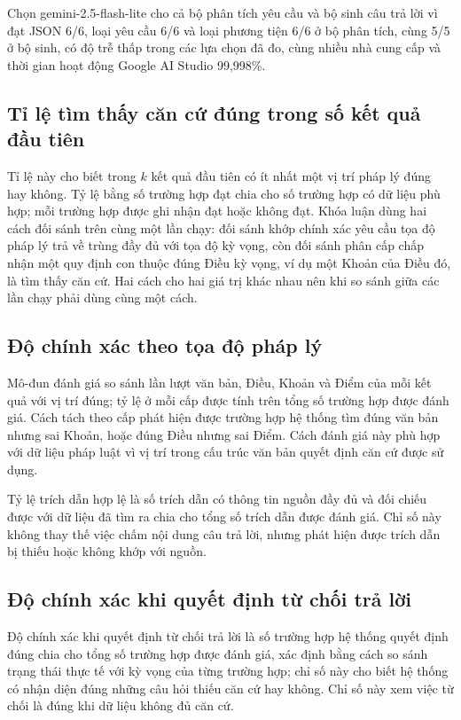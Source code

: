 \documentclass[12pt,a4paper,oneside]{report}
\begin{document}
Chọn gemini-2.5-flash-lite cho cả bộ phân tích yêu cầu và bộ sinh câu trả lời vì đạt JSON 6/6, loại yêu cầu 6/6 và loại phương tiện 6/6 ở bộ phân tích, cùng 5/5 ở bộ sinh, có độ trễ thấp trong các lựa chọn đã đo, cùng nhiều nhà cung cấp và thời gian hoạt động Google AI Studio 99,998\%.
\subsection{Tỉ lệ tìm thấy căn cứ đúng trong số kết quả đầu tiên}
Tỉ lệ này cho biết trong $k$ kết quả đầu tiên có ít nhất một vị trí pháp lý đúng hay không. Tỷ lệ bằng số trường hợp đạt chia cho số trường hợp có dữ liệu phù hợp; mỗi trường hợp được ghi nhận đạt hoặc không đạt. Khóa luận dùng hai cách đối sánh trên cùng một lần chạy: đối sánh khớp chính xác yêu cầu tọa độ pháp lý trả về trùng đầy đủ với tọa độ kỳ vọng, còn đối sánh phân cấp chấp nhận một quy định con thuộc đúng Điều kỳ vọng, ví dụ một Khoản của Điều đó, là tìm thấy căn cứ. Hai cách cho hai giá trị khác nhau nên khi so sánh giữa các lần chạy phải dùng cùng một cách.

\subsection{Độ chính xác theo tọa độ pháp lý}
Mô-đun đánh giá so sánh lần lượt văn bản, Điều, Khoản và Điểm của mỗi kết quả với vị trí đúng; tỷ lệ ở mỗi cấp được tính trên tổng số trường hợp được đánh giá. Cách tách theo cấp phát hiện được trường hợp hệ thống tìm đúng văn bản nhưng sai Khoản, hoặc đúng Điều nhưng sai Điểm. Cách đánh giá này phù hợp với dữ liệu pháp luật vì vị trí trong cấu trúc văn bản quyết định căn cứ được sử dụng.

Tỷ lệ trích dẫn hợp lệ là số trích dẫn có thông tin nguồn đầy đủ và đối chiếu được với dữ liệu đã tìm ra chia cho tổng số trích dẫn được đánh giá. Chỉ số này không thay thế việc chấm nội dung câu trả lời, nhưng phát hiện được trích dẫn bị thiếu hoặc không khớp với nguồn.

\subsection{Độ chính xác khi quyết định từ chối trả lời}
Độ chính xác khi quyết định từ chối trả lời là số trường hợp hệ thống quyết định đúng chia cho tổng số trường hợp được đánh giá, xác định bằng cách so sánh trạng thái thực tế với kỳ vọng của từng trường hợp; chỉ số này cho biết hệ thống có nhận diện đúng những câu hỏi thiếu căn cứ hay không. Chỉ số này xem việc từ chối là đúng khi dữ liệu không đủ căn cứ.
\end{document}
